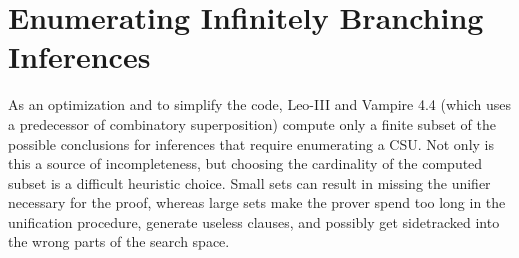 \documentclass[smallcondensed,draft]{svjour3}     %
\begin{document}

\section{Enumerating Infinitely Branching Inferences}
\label{sec:ho-tech:infinite-branching}

As an optimization and to simplify the code, Leo-III
\cite{as-18-phd} and Vampire 4.4 \cite{br-19-restricted-unif} (which uses
a predecessor of combinatory
superposition) compute only a finite subset of the possible conclusions for
inferences that require enumerating a CSU. Not only is this a source of
incompleteness, but choosing the cardinality of the computed subset is a
difficult heuristic choice. Small sets can result in missing the unifier
necessary for the proof, whereas large sets make the prover spend too long in
the unification procedure, generate useless clauses, and possibly get sidetracked into the wrong parts of the search space.
\end{document}
